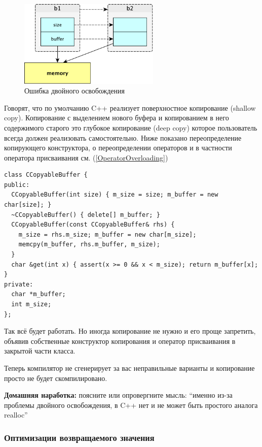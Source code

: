\documentclass[a4paper,12pt,oneside]{article}
\begin{document}
\begin{figure}[h!]
\centering
\includegraphics[width=0.6\textwidth]{illustrations/copying-crop.pdf}
\caption{Ошибка двойного освобождения}
\label{fig:copying-crop}
\end{figure}

Говорят, что по умолчанию C++ реализует поверхностное копирование (shallow copy). Копирование с выделением нового буфера и копированием в него содержимого старого это глубокое копирование (deep copy) которое пользователь всегда должен реализовать самостоятельно. Ниже показано переопределение копирующего конструктора, о переопределении операторов и в частности оператора присваивания см. (\ref{OperatorOverloading})

\begin{lstlisting}
class CCopyableBuffer {
public:
  CCopyableBuffer(int size) { m_size = size; m_buffer = new char[size]; }
  ~CCopyableBuffer() { delete[] m_buffer; }
  CCopyableBuffer(const CCopyableBuffer& rhs) { 
    m_size = rhs.m_size; m_buffer = new char[m_size];
    memcpy(m_buffer, rhs.m_buffer, m_size);
  } 
  char &get(int x) { assert(x >= 0 && x < m_size); return m_buffer[x]; } 
private:
  char *m_buffer;
  int m_size;
};
\end{lstlisting}

Так всё будет работать. Но иногда копирование не нужно и его проще запретить, объявив собственные конструктор копирования и оператор присваивания в закрытой части класса.



Теперь компилятор не сгенерирует за вас неправильные варианты и копирование просто не будет скомпилировано.

\textbf{Домашняя наработка:} поясните или опровергните мысль: ``именно из-за проблемы двойного освобождения, в C++ нет и не может быть простого аналога realloc''

\subsubsection{Оптимизации возвращаемого значения}
\end{document}
